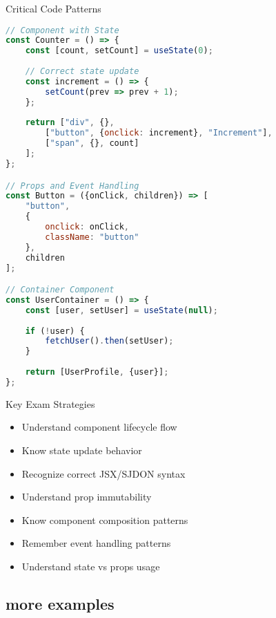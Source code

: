 \begin{examplecode}{Critical Code Patterns}
\begin{lstlisting}[language=JavaScript, style=basesmol]
// Component with State
const Counter = () => {
    const [count, setCount] = useState(0);
    
    // Correct state update
    const increment = () => {
        setCount(prev => prev + 1);
    };
    
    return ["div", {}, 
        ["button", {onclick: increment}, "Increment"],
        ["span", {}, count]
    ];
};

// Props and Event Handling
const Button = ({onClick, children}) => [
    "button",
    {
        onclick: onClick,
        className: "button"
    },
    children
];

// Container Component
const UserContainer = () => {
    const [user, setUser] = useState(null);
    
    if (!user) {
        fetchUser().then(setUser);
    }
    
    return [UserProfile, {user}];
};
\end{lstlisting}
\end{examplecode}

\begin{theorem}{Key Exam Strategies}
    \begin{itemize}
        \item Understand component lifecycle flow
        \item Know state update behavior
        \item Recognize correct JSX/SJDON syntax
        \item Understand prop immutability
        \item Know component composition patterns
        \item Remember event handling patterns
        \item Understand state vs props usage
    \end{itemize}
\end{theorem}

\subsection{more examples}

